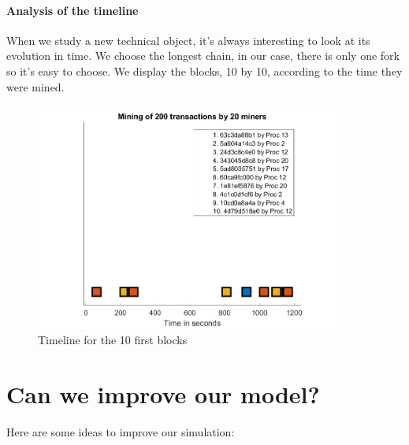\paragraph{Analysis of the timeline}

When we study a new technical object, it's always interesting to look at its evolution in time. We choose the longest chain, in our case, there is only one fork so it's easy to choose. We display the blocks, 10 by 10, according to the time they were mined.

\begin{figure}[ht]
\centering
\includegraphics[width=10cm]{Figures/timeline_1}
\caption{Timeline for the 10 first blocks}
\end{figure}
\medskip


\section{Can we improve our model?} \label{improvements}

Here are some ideas to improve our simulation: \newline

